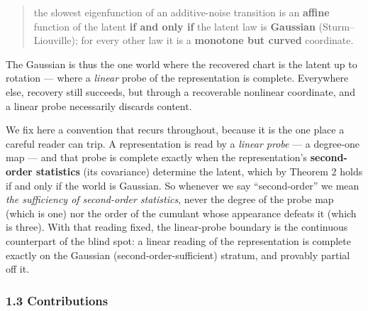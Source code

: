 \documentclass[
  letterpaper,
  11pt]{article}
\theoremstyle{plain}
\theoremstyle{definition}
\theoremstyle{remark}
\begin{document}
\begin{quote}
the slowest eigenfunction of an additive-noise transition is an \textbf{affine} function of the latent \textbf{if and only if} the latent law is \textbf{Gaussian} (Sturm--Liouville);
for every other law it is a \textbf{monotone but curved} coordinate.
\end{quote}

The Gaussian is thus the one world where the recovered chart is the latent up to rotation --- where a \emph{linear} probe of the representation is complete. Everywhere else, recovery still succeeds, but through a recoverable nonlinear coordinate, and a linear probe necessarily discards content.

We fix here a convention that recurs throughout, because it is the one place a careful reader can trip. A representation is read by a \emph{linear probe} --- a degree-one map --- and that probe is complete exactly when the representation's \textbf{second-order statistics} (its covariance) determine the latent, which by Theorem 2 holds if and only if the world is Gaussian. So whenever we say ``second-order'' we mean \emph{the sufficiency of second-order statistics}, never the degree of the probe map (which is one) nor the order of the cumulant whose appearance defeats it (which is three). With that reading fixed, the linear-probe boundary is the continuous counterpart of the blind spot: a linear reading of the representation is complete exactly on the Gaussian (second-order-sufficient) stratum, and provably partial off it.

\subsubsection{1.3 Contributions}\label{contributions}
\end{document}
